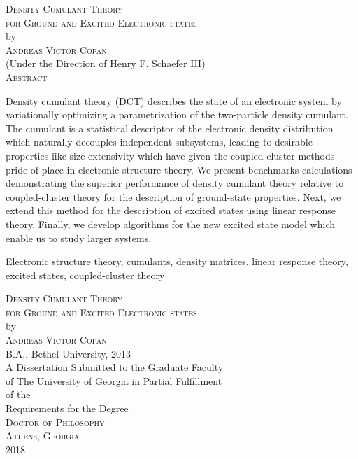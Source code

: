 \documentclass[12pt,notitlepage]{report}
\newcommand{\dissertationtitle}{%
    Density Cumulant Theory\\for Ground and Excited Electronic states}
\newcommand{\whoami}{Andreas Victor Copan}
\begin{document}
\newpage
\thispagestyle{empty}
\vspace*{15pt}
\begin{samepage}
\begin{center}
\textsc{\large{\dissertationtitle}}\\[15pt]
by\\[15pt]
\textsc{\whoami}\\[12pt]
(Under the Direction of Henry F. Schaefer III)\\[12pt]
\textsc{Abstract}
\end{center}
Density cumulant theory (DCT) describes the state of an electronic system by
variationally optimizing a parametrization of the two-particle density cumulant.
The cumulant is a statistical descriptor of the electronic density distribution
which naturally decouples independent subsystems, leading to desirable
properties like size-extensivity which have given the coupled-cluster methods
pride of place in electronic structure theory.
We present benchmarks calculations demonstrating the superior performance of
density cumulant theory relative to coupled-cluster theory for the description
of ground-state properties.
Next, we extend this method for the description of excited states using linear
response theory.
Finally, we develop algorithms for the new excited state model which enable us
to study larger systems.
\thispagestyle{empty}
\begin{list}{\textsc{Index words:\hfill}}{\leftmargin 1.4in}
\item 
\begin{flushleft}\singlespacing
    Electronic structure theory, cumulants, density matrices, linear response
    theory, excited states, coupled-cluster theory
\end{flushleft}
\end{list}
\end{samepage}

\newpage
{}
\thispagestyle{empty}
\vspace*{18pt}
\begin{center}
\textsc{\large{\dissertationtitle}}\\[18pt]
by\\[18pt]
\textsc{\whoami}\\[12pt]
B.A., Bethel University, 2013\\
\vfill
A Dissertation Submitted to the Graduate Faculty \\
of The University of Georgia in Partial Fulfillment \\
of the \\
Requirements for the Degree \\[10pt]
\textsc{Doctor of Philosophy}\\[36pt]
\textsc{Athens, Georgia}\\[18pt]
2018
\end{center}
\end{document}
